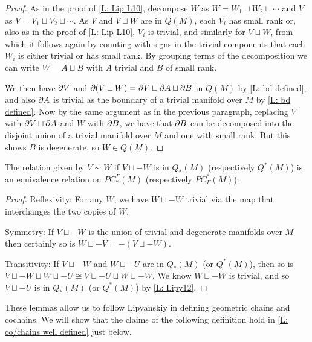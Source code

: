 \begin{proof}
As in the proof of \cref{L: Lip L10}, decompose $W$ as $W = W_1\sqcup W_2\sqcup \cdots$ and $V$ as $V = V_1\sqcup V_2\sqcup \cdots$. As $V$ and $V\sqcup W$ are in $Q(M)$, each $V_i$ has small rank or, also as in the proof of \cref{L: Lip L10}, $V_i$ is trivial, and similarly for $V\sqcup W$, from which it follows again by counting with signs in the trivial components that each $W_i$ is either trivial or has small rank.
By grouping terms of the decomposition we can write $W = A\sqcup B$ with $A$ trivial and $B$ of small rank.

We then have $\partial V$ and $\partial (V\sqcup W) = \partial V\sqcup \partial A\sqcup \partial B$ in $Q(M)$ by \cref{L: bd defined}, and also $\partial A$ is trivial as the boundary of a trivial manifold over $M$ by \cref{L: bd defined}. Now by the same argument as in the previous paragraph, replacing $V$ with $\partial V \sqcup \partial A$ and $W$ with $\partial B$, we have that $\partial B$ can be decomposed into the disjoint union of a trivial manifold over $M$ and one with small rank. But this shows $B$ is degenerate, so $W \in Q(M)$.
\end{proof}

\begin{lemma}\label{L: cancel Q}
The relation given by $V\sim W$ if $V\sqcup -W$ is in $Q_*(M)$ (respectively $Q^*(M)$) is an equivalence relation on $PC^\Gamma_*(M)$ (respectively $PC_\Gamma^*(M)$).
\end{lemma}
\begin{proof}
Reflexivity: For any $W$, we have $W\sqcup -W$ trivial via the map that interchanges the two copies of $W$.

Symmetry: If $V\sqcup -W$ is the union of trivial and degenerate manifolds over $M$ then certainly so is $W\sqcup -V = -(V\sqcup -W)$.

Transitivity: If $V\sqcup -W$ and $W\sqcup -U$ are in $Q_*(M)$ (or $Q^*(M)$), then so is $V\sqcup -W\sqcup W\sqcup -U \cong V\sqcup -U\sqcup W\sqcup -W$. We know $W\sqcup -W$ is trivial, and so $V\sqcup -U$ is in $Q_*(M)$ (or $Q^*(M)$) by \cref{L: Lipy12}.
\end{proof}





These lemmas allow us to follow Lipyanskiy in defining geometric chains and cochains. We will show that the claims of the following definition hold in \cref{L: co/chains well defined} just below.


